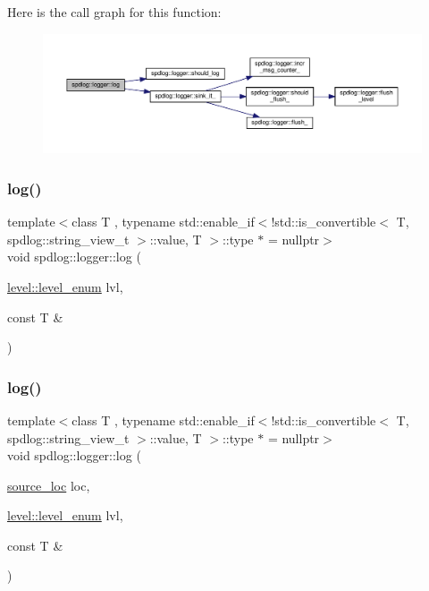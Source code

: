Here is the call graph for this function\+:
\nopagebreak
\begin{figure}[H]
\begin{center}
\leavevmode
\includegraphics[width=350pt]{classspdlog_1_1logger_a4ad269959d007dcbe38cdb3c4e70d85b_cgraph}
\end{center}
\end{figure}
\mbox{\label{classspdlog_1_1logger_a706ca9501457bdda5562cf0dffeca712}} 
\subsubsection{\texorpdfstring{log()}{log()}\hspace{0.1cm}{\footnotesize\ttfamily [7/8]}}
{\footnotesize\ttfamily template$<$class T , typename std\+::enable\+\_\+if$<$!std\+::is\+\_\+convertible$<$ T, spdlog\+::string\+\_\+view\+\_\+t $>$\+::value, T $>$\+::type $\ast$  = nullptr$>$ \\
void spdlog\+::logger\+::log (\begin{DoxyParamCaption}\item[{\hyperlink{namespacespdlog_1_1level_a35f5227e5daf228d28a207b7b2aefc8b}{level\+::level\+\_\+enum}}]{lvl,  }\item[{const T \&}]{ }\end{DoxyParamCaption})}

\mbox{\label{classspdlog_1_1logger_a4ad269959d007dcbe38cdb3c4e70d85b}} 
\subsubsection{\texorpdfstring{log()}{log()}\hspace{0.1cm}{\footnotesize\ttfamily [8/8]}}
{\footnotesize\ttfamily template$<$class T , typename std\+::enable\+\_\+if$<$!std\+::is\+\_\+convertible$<$ T, spdlog\+::string\+\_\+view\+\_\+t $>$\+::value, T $>$\+::type $\ast$  = nullptr$>$ \\
void spdlog\+::logger\+::log (\begin{DoxyParamCaption}\item[{\hyperlink{structspdlog_1_1source__loc}{source\+\_\+loc}}]{loc,  }\item[{\hyperlink{namespacespdlog_1_1level_a35f5227e5daf228d28a207b7b2aefc8b}{level\+::level\+\_\+enum}}]{lvl,  }\item[{const T \&}]{ }\end{DoxyParamCaption})}

